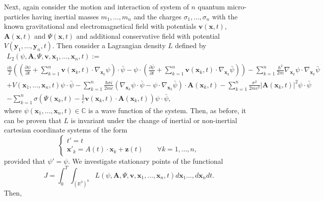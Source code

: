 \documentclass{article}
\theoremstyle{definition}
\theoremstyle{remark}
\renewcommand{\vec}[1]{\mathbf{#1}}
\begin{document}
Next, again consider the motion and interaction of system of $n$
quantum micro-particles having inertial masses $m_1,\ldots, m_n$ and
the charges $\sigma_1,\ldots,\sigma_n$ with the known gravitational
and electromagnetical field with potentials $\vec v(\vec x,t)$,
$\vec A(\vec x,t)$ and $\Psi(\vec x,t)$ and additional conservative
field with potential $V(\vec y_1,\ldots,\vec y_n,t)$. Then consider
a Lagrangian density $L$ defined by
\begin{multline}\label{vhfffngghkjgghDDmmkkksmfggffgZZ}
L_2\left(\psi,\vec A,\Psi,\vec v,\vec x_1,\ldots,\vec x_n,t\right):=\\
\frac{i\hbar}{2}\left(\left(\frac{\partial\psi}{\partial
t}+\sum\limits_{k=1}^{n}\vec v(\vec x_k,t)\cdot\nabla_{\vec
x_k}\psi\right)\cdot\bar\psi-\psi\cdot\left(\frac{\partial\bar\psi}{\partial
t}+\sum\limits_{k=1}^{n}\vec v(\vec x_k,t)\cdot\nabla_{\vec
x_k}\bar\psi\right)\right)-\sum\limits_{k=1}^{n}\frac{\hbar^2}{2m}\nabla_{\vec
x_k}\psi\cdot\nabla_{\vec x_k}\bar\psi\\+V\left(\vec x_1,\ldots,\vec
x_n,t\right)\psi\cdot\bar\psi
-\sum\limits_{k=1}^{n}\frac{\hbar\sigma i}{2mc}\left(\nabla_{\vec
x_k}\psi\cdot\bar\psi-\psi\cdot\nabla_{\vec
x_k}\bar\psi\right)\cdot\vec A(\vec
x_k,t)-\sum\limits_{k=1}^{n}\frac{\sigma^2}{2mc^2}\left|\vec
A(\vec x_k,t)\right|^2\psi\cdot\bar\psi\\
-\sum\limits_{k=1}^{n}\sigma\left(\Psi(\vec x_k,t)-\frac{1}{c}\vec
v(\vec x_k,t)\cdot\vec A(\vec x_k,t)\right)\psi\cdot\bar\psi,
\end{multline}
where $\psi(\vec x_1,\ldots,\vec x_n,t)\in\mathbb{C}$ is a wave
function of the system. Then, as before, it can be proven that $L$
is invariant under the change of inertial or non-inertial cartesian
coordinate systems of the form
\begin{equation*}
\begin{cases}
t'=t\\
\vec x'_k=A(t)\cdot\vec x_k+\vec
z(t)\quad\quad\forall k=1,\ldots,n,\end{cases}
\end{equation*}
provided that $\psi'=\psi$. We investigate stationary points of the
functional
\begin{equation}\label{btfffygtgyggyDDmmkkksmZZ}
J=\int_0^T\int_{\left(\mathbb{R}^3\right)^n}L\left(\psi,\vec
A,\Psi,\vec v,\vec x_1,\ldots,\vec x_n,t\right)d\vec x_1\ldots,d\vec
x_n dt.
\end{equation}
Then,
\end{document}
